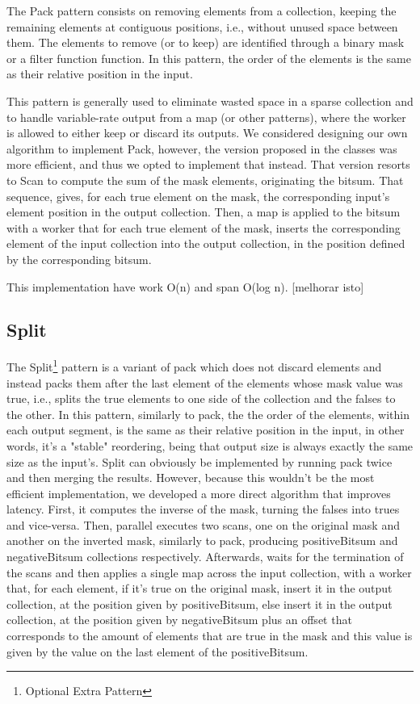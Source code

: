 \documentclass[conference,compsoc]{IEEEtran}
\begin{document}
The Pack pattern consists on removing elements from a collection, keeping the remaining elements at contiguous positions, i.e., without unused space between them. The elements to remove (or to keep) are identified through a binary mask or a filter function function. In this pattern, the order of the elements is the same as their relative position in the input.

This pattern is generally used to eliminate wasted space in a sparse collection and to handle variable-rate output from a map (or other patterns), where the worker is allowed to either keep or discard its outputs.
We considered designing our own algorithm to implement Pack, however, the version proposed in the classes was more efficient, and thus we opted to implement that instead. That version resorts to Scan to compute the sum of the mask elements, originating the bitsum. That sequence, gives, for each true element on the mask, the corresponding input's element position in the output collection. Then, a map is applied to the bitsum with a worker that for each true element of the mask, inserts the corresponding element of the input collection into the output collection, in the position defined by the corresponding bitsum.

This implementation have work O(n) and span O(log n). [melhorar isto]

\subsection{Split}

The Split\footnote[1]{Optional Extra Pattern} pattern is a variant of pack which does not discard elements and instead packs them after the last element of the elements whose mask value was true, i.e., splits the true elements to one side of the collection and the falses to the other.
In this pattern, similarly to pack, the the order of the elements, within each output segment, is the same as their relative position in the input, in other words, it's a "stable" reordering, being that output size is always exactly the same size as the input's.
Split can obviously be implemented by running pack twice and then merging the results. However, because this wouldn't be the most efficient implementation, we developed a more direct algorithm that improves latency. First, it computes the inverse of the mask, turning the falses into trues and vice-versa. Then, parallel executes two scans, one on the original mask and another on the inverted mask, similarly to pack, producing positiveBitsum and negativeBitsum collections respectively. Afterwards, waits for the termination of the scans and then applies a single map across the input collection, with a worker that, for each element, if it's true on the original mask, insert it in the output collection, at the position given by positiveBitsum, else insert it in the output collection, at the position given by negativeBitsum plus an offset that corresponds to the amount of elements that are true in the mask and this value is given by the value on the last element of the positiveBitsum.
\end{document}
